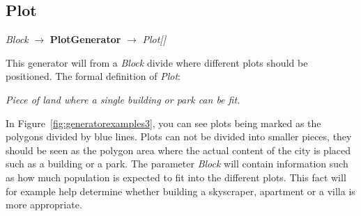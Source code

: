 \subsection{Plot}
\begin{center}
    \textit{Block} $\rightarrow$ \textbf{PlotGenerator} $\rightarrow$ \textit{Plot{[}{]}}
\end{center}
This generator will from a \textit{Block} divide where different plots should be positioned. 
The formal definition of \textit{Plot}:
\begin{center}
    \textit{Piece of land where a single building or park can be fit.}
\end{center}
In Figure~\ref{fig:generatorexamples3}, you can see plots being marked as the polygons divided by blue lines. 
Plots can not be divided into smaller pieces, they should be seen as the polygon area where the actual content of the city is placed such as a building or a park.
The parameter \textit{Block} will contain information such as how much population is expected to fit into the different plots. 
This fact will for example help determine whether building a skyscraper, apartment or a villa is more appropriate.